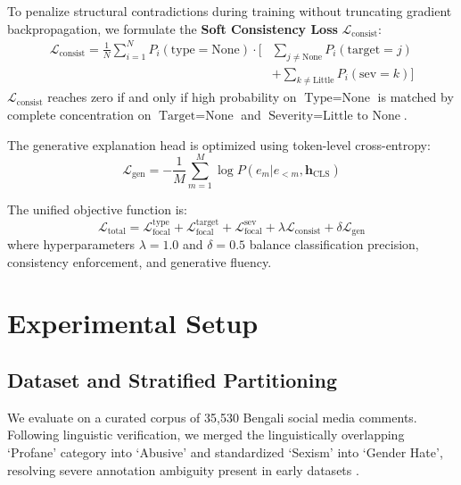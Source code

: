 \documentclass[conference]{IEEEtran}
\begin{document}
To penalize structural contradictions during training without truncating gradient backpropagation, we formulate the \textbf{Soft Consistency Loss} $\mathcal{L}_{\text{consist}}$:
\begin{equation}
\begin{aligned}
\mathcal{L}_{\text{consist}} = \frac{1}{N} \sum_{i=1}^{N} P_i(\text{type}=\text{None}) \cdot \Big[ &\sum_{j \neq \text{None}} P_i(\text{target}=j) \\
&+ \sum_{k \neq \text{Little}} P_i(\text{sev}=k) \Big]
\end{aligned}
\end{equation}
$\mathcal{L}_{\text{consist}}$ reaches zero if and only if high probability on $\text{Type}=\text{None}$ is matched by complete concentration on $\text{Target}=\text{None}$ and $\text{Severity}=\text{Little to None}$.

The generative explanation head is optimized using token-level cross-entropy:
\begin{equation}
\mathcal{L}_{\text{gen}} = -\frac{1}{M} \sum_{m=1}^M \log P(e_m | e_{<m}, \mathbf{h}_{\text{CLS}})
\end{equation}

The unified objective function is:
\begin{equation}
\mathcal{L}_{\text{total}} = \mathcal{L}_{\text{focal}}^{\text{type}} + \mathcal{L}_{\text{focal}}^{\text{target}} + \mathcal{L}_{\text{focal}}^{\text{sev}} + \lambda \mathcal{L}_{\text{consist}} + \delta \mathcal{L}_{\text{gen}}
\end{equation}
where hyperparameters $\lambda = 1.0$ and $\delta = 0.5$ balance classification precision, consistency enforcement, and generative fluency.

\section{Experimental Setup}
\label{sec:exp}

\subsection{Dataset and Stratified Partitioning}
We evaluate on a curated corpus of 35,530 Bengali social media comments. Following linguistic verification, we merged the linguistically overlapping `Profane' category into `Abusive' and standardized `Sexism' into `Gender Hate', resolving severe annotation ambiguity present in early datasets \cite{hasan2026banglamultihate}.
\end{document}
